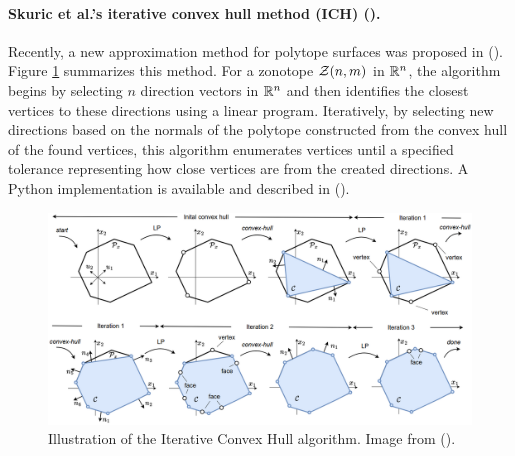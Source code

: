 \paragraph*{Skuric et al.'s iterative convex hull method (ICH) (\cite{skuricOnLineFeasibleWrench2022}).}
Recently, a new approximation method for polytope surfaces was proposed in (\cite{skuricOnLineFeasibleWrench2022}). Figure \ref{fig:ich_method} summarizes this method. For a zonotope $\mathcal{Z}(n,m)$ in $\mathbb{R}^n$, the algorithm begins by selecting $n$ direction vectors in $\mathbb{R}^n$ and then identifies the closest vertices to these directions using a linear program. Iteratively, by selecting new directions based on the normals of the polytope constructed from the convex hull of the found vertices, this algorithm enumerates vertices until a specified tolerance representing how close vertices are from the created directions.
A Python implementation is available and described in (\cite{skuricPycapacityRealtimeTaskspace2023}).

  

\begin{figure}[!htb]
    \captionsetup{justification=centering}
        \centering
        \includegraphics[trim={0 0 0 0},clip, width=1\linewidth]{img/chapter_2/ich_alg.png}
    \caption{Illustration of the Iterative Convex Hull algorithm. Image from (\cite{skuricCoupledViewPhysical}).}
    \label{fig:ich_method}
\end{figure}

